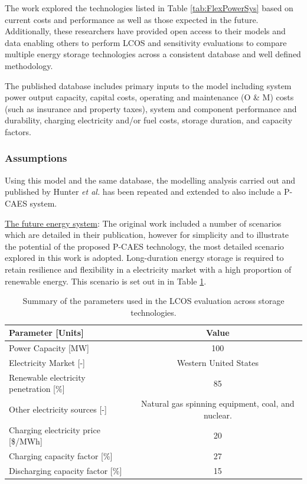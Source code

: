 \documentclass[preprint,12pt]{elsarticle}
\begin{document}
The work explored the technologies listed in Table \ref{tab:FlexPowerSys} based on current costs and performance as well as those expected in the future. Additionally, these researchers have provided open access to their models and data enabling others to perform LCOS and sensitivity evaluations to compare multiple energy storage technologies across a consistent database and well defined methodology.

The published database includes primary inputs to the model including system power output capacity, capital costs, operating and maintenance (O \& M) costs (such as insurance and property taxes), system and component performance and durability, charging electricity and/or fuel costs, storage duration, and capacity factors. 

\subsubsection{Assumptions} 

Using this model and the same database, the modelling analysis carried out and published by Hunter \textit{et al.} \cite{HUNTER20212077} has been repeated and extended to also include a P-CAES system. 

\underline{The future energy system}: The original work included a number of scenarios which are detailed in their publication, however for simplicity and to illustrate the potential of the proposed P-CAES technology, the most detailed scenario explored in this work is adopted. Long-duration energy storage is required to retain resilience and flexibility in a electricity market with a high proportion of renewable energy. This scenario is set out in in Table \ref{tab:CounterfactualScenerio}. 

\begin{table}[h]
\centering
\begin{tabular}{l c}
\toprule
\textbf{Parameter [Units]} & \textbf{Value}\\
\midrule
Power Capacity [MW]	& 100\\
Electricity Market [-]	& Western United States\\
Renewable electricity penetration [\%]	& 85\\
Other electricity sources [-] & Natural gas spinning equipment, coal, and nuclear.\\
Charging electricity price [\$/MWh]	& 20\\
Charging capacity factor [\%]	& 27\\
Discharging capacity factor [\%]	& 15\\
\bottomrule
\end{tabular}
\caption{Summary of the parameters used in the LCOS evaluation across storage technologies.}
\label{tab:CounterfactualScenerio} %
\end{table}
\end{document}
